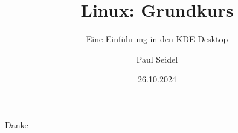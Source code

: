 \documentclass[handout]{beamer}
\title{Linux: Grundkurs}
\subtitle{Eine Einführung in den KDE-Desktop}
\author{Paul Seidel}
\date{26.10.2024} %
\institute{ZKK - Universität Passau}
\begin{document}
    \maketitle

    
    
    
    
    
    
    
    
    

    \begin{frame}[standout]
        Danke
    \end{frame}
\end{document}
